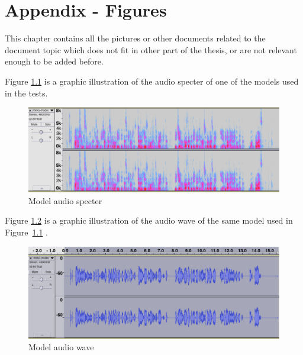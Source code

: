 \chapter{Appendix - Figures}

This chapter contains all the pictures or other documents related to the
document topic which does not fit in other part of the thesis, or are not
relevant enough to be added before.

Figure \ref{fig:specter} is a graphic illustration of the audio specter
of one of the models used in the tests.

\begin{figure}[h]
\caption{Model audio specter}
\label{fig:specter}
\centering
\includegraphics[scale=0.24]{model-spectre.png}
\end{figure}

\pagebreak
Figure \ref{fig:wave} is a graphic illustration of the audio wave
of the same model used in Figure~\ref{fig:specter} .
\begin{figure}[h]
\caption{Model audio wave}
\label{fig:wave}
\centering
\includegraphics[scale=0.24]{model-wave.png}
\end{figure}
